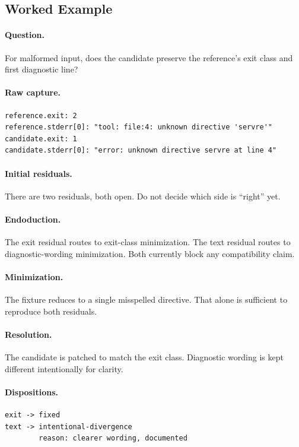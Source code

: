 \documentclass[11pt,a4paper]{article}
\begin{document}
\subsection{Worked Example}

\paragraph{Question.}
For malformed input, does the candidate preserve the reference's exit class and first diagnostic line?

\paragraph{Raw capture.}
\begin{verbatim}
reference.exit: 2
reference.stderr[0]: "tool: file:4: unknown directive 'servre'"
candidate.exit: 1
candidate.stderr[0]: "error: unknown directive servre at line 4"
\end{verbatim}

\paragraph{Initial residuals.}
There are two residuals, both open. Do not decide which side is ``right'' yet.

\paragraph{Endoduction.}
The exit residual routes to exit-class minimization. The text residual routes to diagnostic-wording minimization. Both currently block any compatibility claim.

\paragraph{Minimization.}
The fixture reduces to a single misspelled directive. That alone is sufficient to reproduce both residuals.

\paragraph{Resolution.}
The candidate is patched to match the exit class. Diagnostic wording is kept different intentionally for clarity.

\paragraph{Dispositions.}
\begin{verbatim}
exit -> fixed
text -> intentional-divergence
        reason: clearer wording, documented
\end{verbatim}
\end{document}

